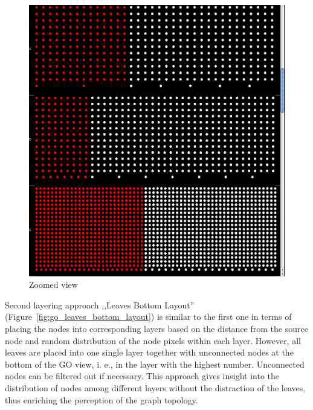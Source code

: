 \begin{figure}[h!]
\centering
\includegraphics[scale=0.3]{pictures/go_levels_layout_zoomed.png}
\caption{Zoomed view}
\label{fig:go_levels_layout_zoomed}
\end{figure}

Second layering approach ,,Leaves Bottom Layout''
(Figure~\ref{fig:go_leaves_bottom_layout}) is similar to the first one in terms of placing the nodes into corresponding layers based on the distance
from the source node and random distribution of the node pixels within each layer.
However, all leaves are placed into one single layer together with unconnected nodes at the bottom of the GO view, i. e., in the layer with the highest number.
Unconnected nodes can be filtered out if necessary. This approach gives insight into the distribution of nodes among different layers without the distraction of the leaves,
thus enriching the perception of the graph topology.

